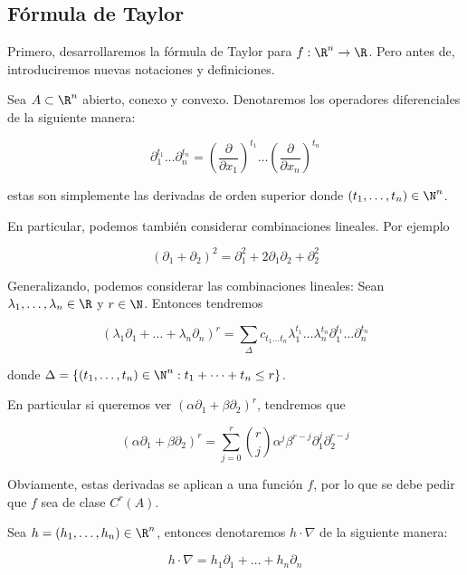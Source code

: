 \subsection{Fórmula de Taylor}

Primero, desarrollaremos la fórmula de Taylor para $f: \R^n \rightarrow \R$. Pero antes de, introduciremos nuevas notaciones y definiciones.

\begin{nota}
    Sea $A \subset \R^n$ abierto, conexo y convexo. Denotaremos los operadores diferenciales de la siguiente manera:
    
    \[
    \partial_1^{t_1} \dots \partial_n^{t_n} = \left( \dfrac{\partial}{\partial x_1} \right)^{t_1} \dots \left( \dfrac{\partial}{\partial x_n} \right)^{t_n}
    \]
    
    \noindent estas son simplemente las derivadas de orden superior donde $(t_1, \dots, t_n) \in \N^n$.
    
    En particular, podemos también considerar combinaciones lineales. Por ejemplo
    
    \[
    (\partial_1 + \partial_2)^2 = \partial_1^2 + 2 \partial_1\partial_2 + \partial_2^2
    \]
    
    Generalizando, podemos considerar las combinaciones lineales: Sean $\lambda_1, \dots, \lambda_n \in \R$ y $r \in \N$. Entonces tendremos
    
    \[
    (\lambda_1\partial_1 + \dots + \lambda_n\partial_n)^r = \sum_{\Delta} c_{t_1 \dots t_n}\lambda_1^{t_1}\dots\lambda_n^{t_n}\partial_1^{t_1}\dots\partial_n^{t_n}
    \]
    
    \noindent donde $\Delta = \{(t_1, \dots, t_n) \in \N^n : t_1 + \dots + t_n \leq r\}$.
    
    En particular si queremos ver $(\alpha\partial_1 + \beta\partial_2)^r$, tendremos que
    
    \[
    (\alpha\partial_1 + \beta\partial_2)^r = \sum_{j=0}^r \binom{r}{j} \alpha^j \beta^{r-j} \partial_1^j\partial_2^{r-j}
    \]
    
    Obviamente, estas derivadas se aplican a una función $f$, por lo que se debe pedir que $f$ sea de clase $C^r(A)$.
\end{nota}

\begin{nota}
    Sea $h = (h_1, \dots, h_n) \in \R^n$, entonces denotaremos $h \cdot \nabla$ de la siguiente manera:
    
    \[
    h \cdot \nabla = h_1\partial_1 + \dots + h_n\partial_n
    \]
\end{nota}


